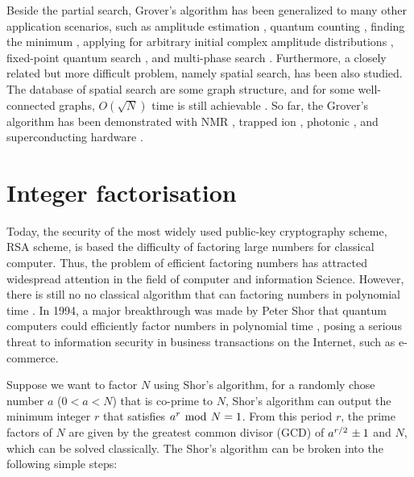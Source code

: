 \documentclass[aps,pra,singlecolumn,superscriptaddress]{revtex4-1}
\begin{document}
Beside the partial search, Grover's algorithm has been generalized to many other application scenarios, such as amplitude estimation \cite{brassard2002quantum}, quantum counting \cite{boyer1996tight,brassard1998quantum, mosca1998quantum}, finding the minimum \cite{durr1996quantum, nayak1999quantum, kowada2008new}, applying for arbitrary initial complex amplitude distributions \cite{biham1999grover}, fixed-point quantum search \cite{grover2005fixed,tulsi2005new,yoder2014fixed}, and multi-phase search \cite{tan2014quantum}. Furthermore, a closely related but more difficult problem, namely spatial search, has been also studied. The database of spatial search are some graph structure, and for some well-connected graphs, $O(\sqrt{N})$ time is still achievable \cite{childs2004spatial,chakraborty2016spatial,wong2016quantum,janmark2014global,meyer2015connectivity,wong2016spatial}. So far, the Grover's algorithm has been demonstrated with NMR \cite{chuang1998experimental}, trapped ion \cite{brickman2005implementation}, photonic \cite{walther2005experimental}, and superconducting hardware \cite{dicarlo2009demonstration}.

\section{Integer factorisation}

Today, the security of the most widely used public-key cryptography scheme, RSA scheme, is based the difficulty of factoring large numbers for classical computer. Thus, the problem of efficient factoring numbers has attracted widespread attention in the field of computer and information Science. However, there is still no no classical algorithm that can factoring numbers in polynomial time \cite{pollard1974theorems}. In 1994, a major breakthrough was made by Peter Shor that quantum computers could efficiently factor numbers in polynomial time \cite{shor1997polynomial,shor1994algorithms}, posing a serious threat to information security in business transactions on the Internet, such as e-commerce.

Suppose we want to factor $N$ using Shor's algorithm, for a randomly chose number ${a}$ ($0<a<N$) that is co-prime to $N$, Shor's algorithm can output the minimum integer $r$ that satisfies ${{a^r}{\kern 1pt} \bmod {\kern 1pt} N = 1}$.  From this period $r$, the prime factors of $N$ are given by the greatest common divisor (GCD) of ${{a^{r/2}}{\kern 1pt}  \pm 1}$ and ${N}$, which can be solved classically. The Shor's algorithm can be broken into the following simple steps:
\end{document}
